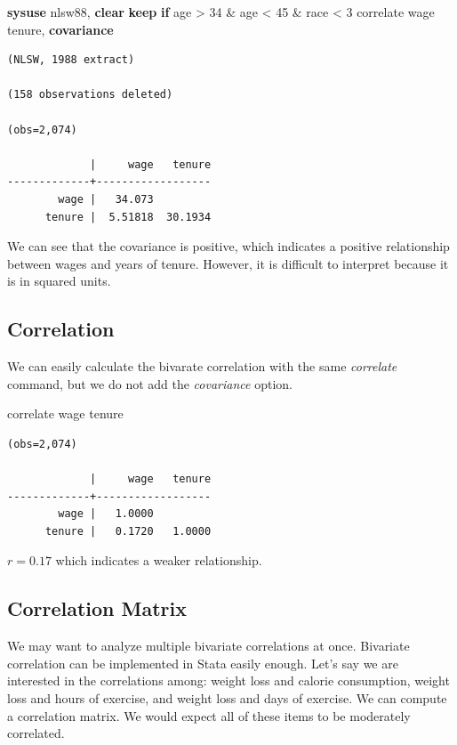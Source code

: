 \documentclass[
]{book}
\newenvironment{Shaded}{\begin{snugshade}}{\end{snugshade}}
\newcommand{\KeywordTok}[1]{\textcolor[rgb]{0.13,0.29,0.53}{\textbf{#1}}}
\newcommand{\NormalTok}[1]{#1}
\begin{document}
\begin{Shaded}
\begin{Highlighting}[]
\KeywordTok{sysuse}\NormalTok{ nlsw88, }\KeywordTok{clear}
\KeywordTok{keep} \KeywordTok{if}\NormalTok{ age \textgreater{} 34 \& age \textless{} 45 \& race \textless{} 3}
\NormalTok{correlate wage tenure, }\KeywordTok{covariance}
\end{Highlighting}
\end{Shaded}

\begin{verbatim}
(NLSW, 1988 extract)

(158 observations deleted)

(obs=2,074)

             |     wage   tenure
-------------+------------------
        wage |   34.073
      tenure |  5.51818  30.1934
\end{verbatim}

We can see that the covariance is positive, which indicates a positive relationship between wages and years of tenure. However, it is difficult to interpret because it is in squared units.

\subsection{Correlation}\label{correlation}

We can easily calculate the bivarate correlation with the same \emph{correlate} command, but we do not add the \emph{covariance} option.

\begin{Shaded}
\begin{Highlighting}[]
\NormalTok{correlate wage tenure}
\end{Highlighting}
\end{Shaded}

\begin{verbatim}
(obs=2,074)

             |     wage   tenure
-------------+------------------
        wage |   1.0000
      tenure |   0.1720   1.0000
\end{verbatim}

\(r = 0.17\) which indicates a weaker relationship.

\subsection{Correlation Matrix}\label{correlation-matrix}

We may want to analyze multiple bivariate correlations at once. Bivariate correlation can be implemented in Stata easily enough. Let's say we are interested in the correlations among: weight loss and calorie consumption, weight loss and hours of exercise, and weight loss and days of exercise. We can compute a correlation matrix. We would expect all of these items to be moderately correlated.
\end{document}
